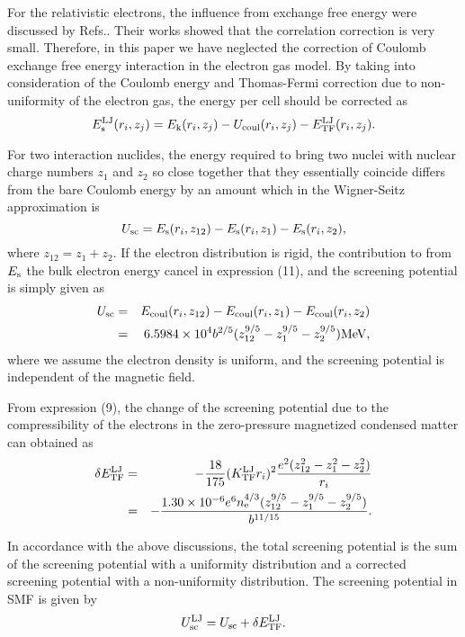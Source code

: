 \documentclass[manuscript]{aastex}
\begin{document}
For the relativistic electrons, the influence from exchange free
energy were discussed by Refs.\cite{Stolzmann96, Yakovlev89}. Their
works showed that the correlation correction is very small.
Therefore, in this paper we have neglected the correction of Coulomb
exchange free energy interaction in the electron gas model. By
taking into consideration of the Coulomb energy and Thomas-Fermi
correction due to non-uniformity of the electron gas, the energy per
cell should be corrected as
\begin{equation}
 E_{{\rm{s}}}^{{\rm{LJ}}}(r_{i},z_{j})=E_{{\rm{k}}}(r_{i},z_{j})-U_{{\rm{coul}}}(r_{i},z_{j})-E_{{\rm{TF}}}^{{\rm{LJ}}}(r_{i},z_{j}).
\label{12}
\end{equation}

For two interaction nuclides, the energy required to bring two
nuclei with nuclear charge numbers $z_1$ and $z_2$ so close together
that they essentially coincide differs from the bare Coulomb energy
by an amount which in the Wigner-Seitz approximation is
\begin{equation}
U_{{\rm{sc}}}=E_{{\rm{s}}}(r_{i},z_{12})-E_{{\rm{s}}}(r_{i},z_1)-E_{\rm{s}}(r_{i},z_2),
\label{13}
\end{equation}
where $z_{12}=z_{1}+z_{2}$. If the electron distribution is rigid,
the contribution to from $E_{\rm{s}}$ the bulk electron energy
cancel in expression (11), and the screening potential is simply
given as
\begin{eqnarray}
 U_{\rm{sc}}&=&E_{\rm{coul}}(r_{i},z_{12})-E_{\rm{coul}}(r_{i},z_1)-E_{\rm{coul}}(r_{i},z_2)\nonumber\\
 &=&6.5984\times10^4b^{2/5}(z_{12}^{9/5}-z_{1}^{9/5}-z_{2}^{9/5})
 \rm{MeV},
\label{14}
\end{eqnarray}
where we assume the electron density is uniform, and the screening
potential is independent of the magnetic field.


From expression (9), the change of the screening potential due to
the compressibility of the electrons in the zero-pressure magnetized
condensed matter can obtained as
\begin{eqnarray}
 \delta E_{\rm{TF}}^{\rm{LJ}}&=&-\frac{18}{175}(K_{\rm{TF}}^{\rm{LJ}}r_{i})^2\frac{e^2(z_{12}^2-z_1^2-z_2^2)}{r_{i}}\nonumber\\
&=&-\frac{1.30\times10^{-6}e^6n_{\rm{e}}^{4/3}(z_{12}^{9/5}-z_1^{9/5}-z_2^{9/5})}{b^{11/15}}.
\label{15}
\end{eqnarray}

In accordance with the above discussions, the total screening
potential is the sum of the screening potential with a uniformity
distribution and a corrected screening potential with a
non-uniformity distribution. The screening potential in SMF is given
by
\begin{equation}
U_{\rm{sc}}^{\rm{LJ}}=U_{\rm{sc}}+\delta E_{\rm{TF}}^{\rm{LJ}}.
\label{16}
\end{equation}
\end{document}
